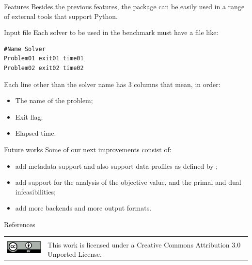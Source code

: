 \documentclass[a0paper,portrait]{baposter}
\begin{document}
\begin{poster}
\begin{posterbox}[column=1]{Features}
    Besides the previous features, the package can be easily used in a range
    of external tools that support Python.
  \end{posterbox}

  \begin{posterbox}[column=1,below=auto]{Input file}
    Each solver to be used in the benchmark must have a file like:

    \begin{lstlisting}
#Name Solver
Problem01 exit01 time01
Problem02 exit02 time02
    \end{lstlisting}

    Each line other than the solver name has 3 columns that mean, in order:
    \begin{itemize}[noitemsep]
      \item The name of the problem;
      \item Exit flag;
      \item Elapsed time.
    \end{itemize}
  \end{posterbox}

  \begin{posterbox}[column=1,below=auto]{Future works}
    Some of our next improvements consist of:
    \begin{itemize}[noitemsep]
      \item add metadata support and also support data profiles as defined by
        \textcite{More2009};
      \item add support for the analysis of the objective value, and the primal and
        dual infeasibilities;
      \item add more backends and more output formats.
    \end{itemize}
  \end{posterbox}

  \begin{posterbox}[column=1,below=auto]{References}
    \printbibliography[heading=none]
  \end{posterbox}

  \begin{posterbox}[column=0,span=2,below=auto,height=bottom,
    boxshade=none,textborder=none,headerborder=none,headershade=plain,
  headerColorOne=bgcolor2, boxheaderheight=0cm]{}
  \begin{center}
    \begin{tabular}{cl}
      \multirow{3}{*}{\includegraphics[height=24pt]{figures/cc-by}} & \\
                                                                    & \Large
      This work is licensed under a
       Creative Commons Attribution 3.0 Unported License.
    \end{tabular}
  \end{center}
  \end{posterbox}
\end{poster}
\end{document}
